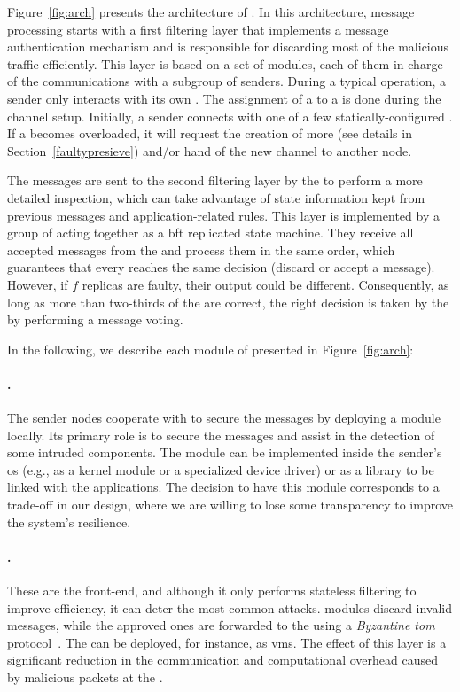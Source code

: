 Figure~\ref{fig:arch} presents the architecture of \sieveq. 
In this architecture, message processing starts with a first filtering layer that implements a message authentication mechanism and is responsible for discarding most of the malicious traffic efficiently. 
This layer is based on a set of \presieve modules, each of them in charge of the communications with a subgroup of senders. 
During a typical operation, a sender only interacts with its own \presieve.
The assignment of a \sender to a \presieve is done during the channel setup.
Initially, a sender connects with one of a few statically-configured \presieves.
If a \presieve becomes overloaded, it will request the creation of more \presieves (see details in Section~\ref{faultypresieve}) and/or hand of the new \sender channel to another node.



The messages are sent to the second filtering layer by the \presieve to perform a more detailed inspection, which can take advantage of state information kept from previous messages and application-related rules.
This layer is implemented by a group of \repsieves acting together as a \gls{bft} replicated state machine.
They receive all accepted messages from the \presieves and process them in the same order, which guarantees that every \repsieve reaches the same decision (discard or accept a message).
However, if $f$ replicas are faulty, their output could be different.
Consequently, as long as more than two-thirds of the \repsieves are correct, the right decision is taken by the \postsieve by performing a message voting.

In the following, we describe each module of \sieveq presented in Figure~\ref{fig:arch}:


\paragraph{\Sender.} The sender nodes cooperate with \sieveq to secure the messages by deploying a \sender module locally. 
Its primary role is to secure the messages and assist in the detection of some intruded \sieveq components. 
The module can be implemented inside the sender's \gls{os} (e.g., as a kernel module or a specialized device driver) or as a library to be linked with the applications.
The decision to have this module corresponds to a trade-off in our design, where we are willing to lose some transparency to improve the system's resilience.

\paragraph{\Presieve.}
These are the \sieveq front-end, and although it only performs stateless filtering to improve efficiency, it can deter the most common attacks. 
\Presieve modules discard invalid messages, while the approved ones are forwarded to the \repsieve using a \emph{Byzantine \gls{tom}} protocol~\cite{Bessani:2014}. 
The \presieves can be deployed, for instance, as \glspl{vm}. 
The effect of this layer is a significant reduction in the communication and computational overhead caused by malicious packets at the \repsieve.

